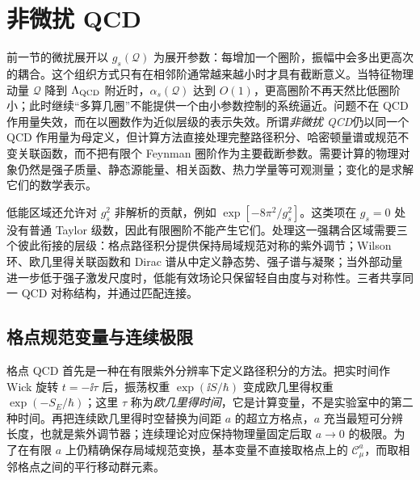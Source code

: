 \section{非微扰 QCD}\label{sec:qcd-nonperturbative-dp15}

前一节的微扰展开以 $g_s(\mathcal Q)$ 为展开参数：每增加一个圈阶，振幅中会多出更高次的耦合。这个组织方式只有在相邻阶通常越来越小时才具有截断意义。当特征物理动量 $\mathcal Q$ 降到 $\Lambda_{\rm QCD}$ 附近时，$\alpha_s(\mathcal Q)$ 达到 $O(1)$，更高圈阶不再天然比低圈阶小；此时继续“多算几圈”不能提供一个由小参数控制的系统逼近。问题不在 QCD 作用量失效，而在以圈数作为近似层级的表示失效。所谓\emph{非微扰 QCD}仍以同一个 QCD 作用量为母定义，但计算方法直接处理完整路径积分、哈密顿量谱或规范不变关联函数，而不把有限个 Feynman 圈阶作为主要截断参数。需要计算的物理对象仍然是强子质量、静态源能量、相关函数、热力学量等可观测量；变化的是求解它们的数学表示。

低能区域还允许对 $g_s^2$ 非解析的贡献，例如 $\exp[-8\pi^2/g_s^2]$。这类项在 $g_s=0$ 处没有普通 Taylor 级数，因此有限圈阶不能产生它们。处理这一强耦合区域需要三个彼此衔接的层级：格点路径积分提供保持局域规范对称的紫外调节；Wilson 环、欧几里得关联函数和 Dirac 谱从中定义静态势、强子谱与凝聚；当外部动量进一步低于强子激发尺度时，低能有效场论只保留轻自由度与对称性。三者共享同一 QCD 对称结构，并通过匹配连接。

\subsection{格点规范变量与连续极限}

格点 QCD 首先是一种在有限紫外分辨率下定义路径积分的方法。把实时间作 Wick 旋转 $t=-\ii\tau$ 后，振荡权重 $\exp(\ii S/\hbar)$ 变成欧几里得权重 $\exp(-S_E/\hbar)$；这里 $\tau$ 称为\emph{欧几里得时间}，它是计算变量，不是实验室中的第二种时间。再把连续欧几里得时空替换为间距 $a$ 的超立方格点，$a$ 充当最短可分辨长度，也就是紫外调节器；连续理论对应保持物理量固定后取 $a\to0$ 的极限。为了在有限 $a$ 上仍精确保存局域规范变换，基本变量不直接取格点上的 $\mathscr C_\mu^a$，而取相邻格点之间的平行移动群元素。

